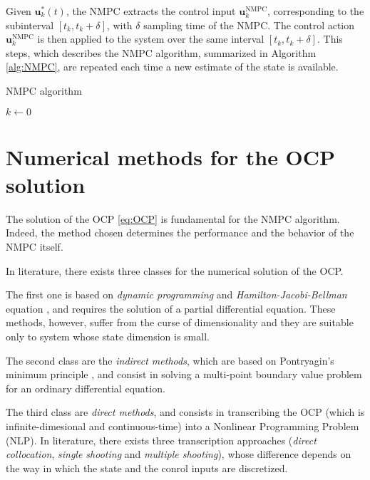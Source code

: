Given $\bm{u}_k^*(t)$, the NMPC extracts the control input
$\bm{u}_k^{\mathrm{NMPC}}$, corresponding to the subinterval $[t_k, t_k + \delta]$,
with $\delta$ sampling time of the NMPC. The control action $\bm{u}_k^{\mathrm{NMPC}}$
is then applied to the system over the same interval $[t_k, t_k + \delta]$.
This steps, which describes the NMPC algorithm, summarized in Algorithm 
\ref{alg:NMPC}, are repeated each time a new estimate of the state is available.

\begin{algorithm}
	\small
	\caption{NMPC algorithm}
	\label{alg:NMPC}
    $k \leftarrow 0$\;
\end{algorithm}

\section{Numerical methods for the OCP solution}
The solution of the OCP \eqref{eq:OCP} is fundamental for the NMPC algorithm.
Indeed, the method chosen determines the performance and the behavior of the 
NMPC itself.

In literature, there exists three classes for the numerical solution of the OCP.

The first one is based on \textit{dynamic programming} and
\textit{Hamilton-Jacobi-Bellman}
equation \cite{Bertsekas2005DynamicProgrammingandOptimalControl}, and requires the solution of a 
partial differential equation. These methods, however, suffer from the curse of 
dimensionality and they are suitable only to system whose state dimension
is small.

The second class are the \textit{indirect methods}, which are based on
Pontryagin's minimum principle \cite{Liberzon2012CalculusofVariations}, and
consist in solving a multi-point boundary value problem for an ordinary 
differential equation.

The third class are \textit{direct methods}, and consists in transcribing 
the OCP (which is infinite-dimesional and continuous-time) into a Nonlinear
Programming Problem (NLP). In literature, there exists three transcription 
approaches (\textit{direct collocation}, \textit{single shooting} and 
\textit{multiple shooting}), whose difference depends on the way in which the
state and the conrol inputs are discretized.

